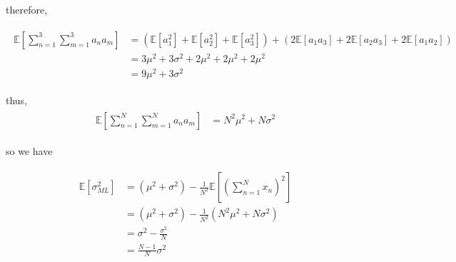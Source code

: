 therefore,

\begin{align}
    \begin{split}
        \mathbb{E}[\sum_{n=1}^3\sum_{m=1}^3 a_na_m] & = (\mathbb{E}[a_1^2] + \mathbb{E}[a_2^2] + \mathbb{E}[a_3^2]) + (2\mathbb{E}[a_1a_3] + 2\mathbb{E}[a_2a_3] + 2\mathbb{E}[a_1a_2])\\
        & = 3\mu^2 + 3\sigma^2 + 2\mu^2 + 2\mu^2 + 2\mu^2\\
        & = 9\mu^2 + 3\sigma^2
    \end{split}
\end{align}

thus,
\begin{align}
    \begin{split}
        \mathbb{E}[\sum_{n=1}^N\sum_{m=1}^N a_na_m] & = N^2\mu^2 + N\sigma^2
    \end{split}
\end{align}

so we have

\begin{align}
    \begin{split}
        \mathbb{E}[\sigma^2_{ML}] & = (\mu^2 + \sigma^2) - \frac{1}{N^2}\mathbb{E}[(\sum_{n=1}^Nx_n)^2]\\
        & = (\mu^2 + \sigma^2) - \frac{1}{N^2}(N^2 \mu^2 + N \sigma^2)\\
        & = \sigma^2 - \frac{\sigma^2}{N}\\
        & = \frac{N - 1}{N}\sigma^2
    \end{split}
\end{align}